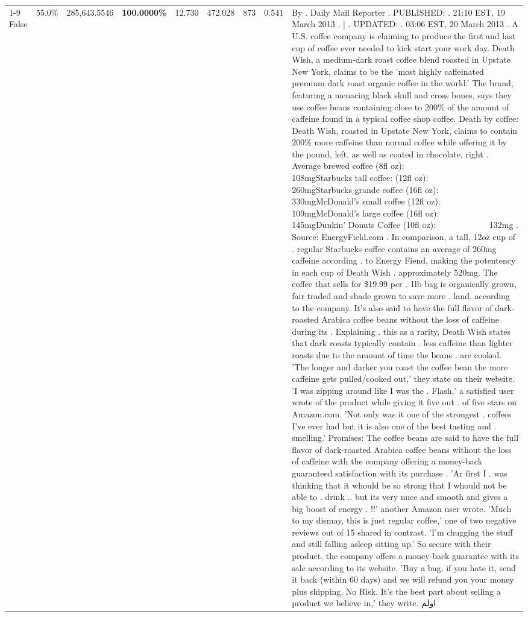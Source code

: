 \begin{table}[H]
{\begin{tabular}{lllrlllll}
\cline{1-9}
False & 55.0\% & 285,643.5546 & \bfseries \color{red} 100.0000\% & 12.730 & 472.028 & 873 & 0.541 & By . Daily Mail Reporter . PUBLISHED: . 21:10 EST, 19 March 2013 . | . UPDATED: . 03:06 EST, 20 March 2013 . A U.S. coffee company is claiming to produce the first and last cup of coffee ever needed to kick start your work day. Death Wish, a medium-dark roast coffee blend roasted in Upstate New York, claims to be the 'most highly caffeinated premium dark roast organic coffee in the world.' The brand, featuring a menacing black skull and cross bones, says they use coffee beans containing close to 200\% of the amount of caffeine found in a typical coffee shop coffee. Death by coffee: Death Wish, roasted in Upstate New York, claims to contain 200\% more caffeine than normal coffee while offering it by the pound, left, as well as coated in chocolate, right . Average brewed coffee (8fl oz):              108mgStarbucks tall coffee: (12fl oz):                260mgStarbucks grande coffee (16fl oz):         330mgMcDonald's small coffee (12fl oz):           109mgMcDonald's large coffee (16fl oz):           145mgDunkin' Donuts Coffee (10fl oz):             132mg . Source: EnergyField.com . In comparison, a tall, 12oz cup of . regular Starbucks coffee contains an average of 260mg caffeine according . to Energy Fiend, making the potentency in each cup of Death Wish . approximately 520mg. The coffee that sells for \$19.99 per . 1lb bag is organically grown, fair traded and shade grown to save more . land, according to the company. It's also said to have the full flavor of dark-roasted Arabica coffee beans without the loss of caffeine during its . Explaining . this as a rarity, Death Wish states that dark roasts typically contain . less caffeine than lighter roasts due to the amount of time the beans . are cooked. 'The longer and darker you roast the coffee bean the more caffeine gets pulled/cooked out,' they state on their website. 'I was zipping around like I was the . Flash,' a satisfied user wrote of the product while giving it five out . of five stars on Amazon.com. 'Not only was it one of the strongest . coffees I've ever had but it is also one of the best tasting and . smelling.’ Promises: The coffee beans are said to have the full flavor of dark-roasted Arabica coffee beans without the loss of caffeine with the company offering a money-back guaranteed satisfaction with its purchase . 'Ar first I . was thinking that it whould be so strong that I whould not be able to . drink .. but its very nuce and smooth and gives a big boost of energy . !!' another Amazon user wrote. 'Much to my dismay, this is just regular coffee,' one of two negative reviews out of 15 shared in contrast. 'I'm chugging the stuff and still falling asleep sitting up.' So secure with their product, the company offers a money-back guarantee with its sale according to its website. 'Buy a bag, if you hate it, send it back (within 60 days) and we will refund you your money plus shipping. No Risk. It’s the best part about selling a product we believe in,' they write. اولم \\

\end{tabular}}
\end{table}
